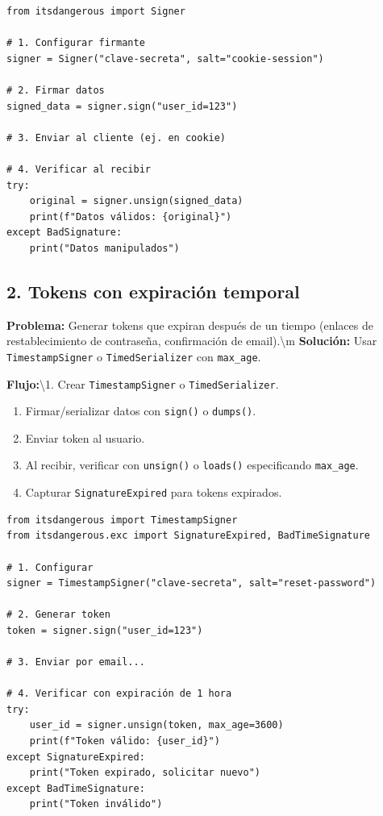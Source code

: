 \documentclass[11pt,a4paper]{article}
\begin{document}
\begin{lstlisting}
from itsdangerous import Signer

# 1. Configurar firmante
signer = Signer("clave-secreta", salt="cookie-session")

# 2. Firmar datos
signed_data = signer.sign("user_id=123")

# 3. Enviar al cliente (ej. en cookie)

# 4. Verificar al recibir
try:
    original = signer.unsign(signed_data)
    print(f"Datos válidos: {original}")
except BadSignature:
    print("Datos manipulados")
\end{lstlisting}


\subsection*{2. Tokens con expiración temporal}


\textbf{Problema:} Generar tokens que expiran después de un tiempo (enlaces de restablecimiento de contraseña, confirmación de email).\textbackslash{}m \textbf{Solución:} Usar \texttt{TimestampSigner} o \texttt{TimedSerializer} con \texttt{max\_age}.


\textbf{Flujo:}\textbackslash{}1. Crear \texttt{TimestampSigner} o \texttt{TimedSerializer}.


\begin{enumerate}[leftmargin=*,topsep=2pt,itemsep=1pt]
  \item Firmar/serializar datos con \texttt{sign()} o \texttt{dumps()}.
  \item Enviar token al usuario.
  \item Al recibir, verificar con \texttt{unsign()} o \texttt{loads()} especificando \texttt{max\_age}.
  \item Capturar \texttt{SignatureExpired} para tokens expirados.
\end{enumerate}


\begin{lstlisting}
from itsdangerous import TimestampSigner
from itsdangerous.exc import SignatureExpired, BadTimeSignature

# 1. Configurar
signer = TimestampSigner("clave-secreta", salt="reset-password")

# 2. Generar token
token = signer.sign("user_id=123")

# 3. Enviar por email...

# 4. Verificar con expiración de 1 hora
try:
    user_id = signer.unsign(token, max_age=3600)
    print(f"Token válido: {user_id}")
except SignatureExpired:
    print("Token expirado, solicitar nuevo")
except BadTimeSignature:
    print("Token inválido")
\end{lstlisting}
\end{document}
